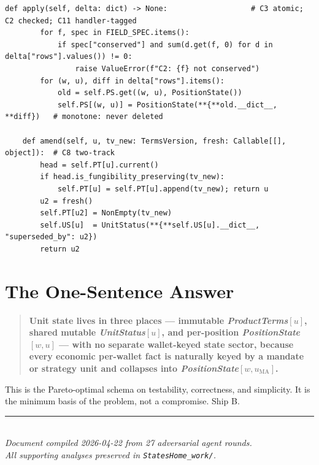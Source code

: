 \documentclass[11pt,a4paper]{article}
\begin{document}
\begin{lstlisting}[language=pythonstyle]
    def apply(self, delta: dict) -> None:                   # C3 atomic; C2 checked; C11 handler-tagged
        for f, spec in FIELD_SPEC.items():
            if spec["conserved"] and sum(d.get(f, 0) for d in delta["rows"].values()) != 0:
                raise ValueError(f"C2: {f} not conserved")
        for (w, u), diff in delta["rows"].items():
            old = self.PS.get((w, u), PositionState())
            self.PS[(w, u)] = PositionState(**{**old.__dict__, **diff})   # monotone: never deleted

    def amend(self, u, tv_new: TermsVersion, fresh: Callable[[], object]):  # C8 two-track
        head = self.PT[u].current()
        if head.is_fungibility_preserving(tv_new):
            self.PT[u] = self.PT[u].append(tv_new); return u
        u2 = fresh()
        self.PT[u2] = NonEmpty(tv_new)
        self.US[u]  = UnitStatus(**{**self.US[u].__dict__, "superseded_by": u2})
        return u2
\end{lstlisting}

\section{The One-Sentence Answer}
\label{sec:onesentence}

\begin{quote}
\textbf{Unit state lives in three places --- immutable \textit{ProductTerms}$[u]$, shared mutable \textit{UnitStatus}$[u]$, and per-position \textit{PositionState}$[w, u]$ --- with no separate wallet-keyed state sector, because every economic per-wallet fact is naturally keyed by a mandate or strategy unit and collapses into \textit{PositionState}$[w, u_{\mathrm{MA}}]$.}
\end{quote}

\noindent This is the Pareto-optimal schema on testability, correctness, and simplicity. It is the minimum basis of the problem, not a compromise. Ship B.

\vfill
\begin{center}
\rule{0.5\textwidth}{0.4pt}\\[4pt]
\textit{Document compiled 2026-04-22 from 27 adversarial agent rounds.}\\
\textit{All supporting analyses preserved in \texttt{StatesHome\_work/}.}
\end{center}
\end{document}
